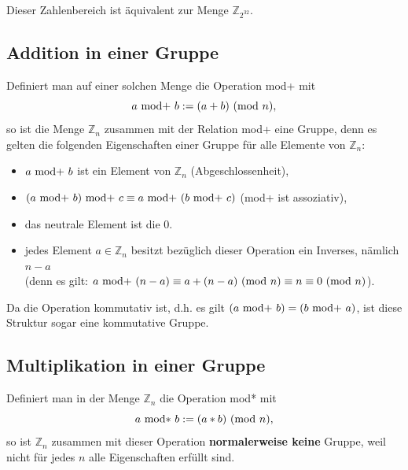 \begin{refsegment}
Dieser Zahlenbereich ist äquivalent zur Menge $\mathbb{Z}_{2^{32}}$.


\subsection{Addition in einer Gruppe}

Definiert man auf einer solchen Menge die Operation mod+ mit
$$ a {\rm ~mod+~} b := (a + b){\rm ~(mod~}n) , $$
so ist die Menge $\mathbb{Z}_n$ zusammen mit der Relation mod+ eine Gruppe, denn es
gelten die folgenden Eigenschaften einer Gruppe für alle Elemente von $\mathbb{Z}_n$:
\begin{itemize}
    \item   $ a {\rm ~mod+~} b$ ist ein Element von $\mathbb{Z}_n$  (Abgeschlossenheit),
    \item   $(a {\rm ~mod+~} b) {\rm ~mod+~} c \equiv a {\rm ~mod+~} (b {\rm ~mod+~} c)$  (mod+ ist assoziativ),
    \item   das neutrale Element ist die $0$.
  \item   jedes Element $a \in \mathbb{Z}_n$ besitzt bezüglich dieser Operation ein Inverses, nämlich $n-a$\\
                (denn es gilt: $a {\rm ~mod+~} (n-a) \equiv a + (n-a){\rm ~(mod~}n) \equiv n \equiv 0 {\rm ~(mod~}n)$).
\end{itemize}
Da die Operation kommutativ ist, d.h. es gilt $(a {\rm ~mod+~} b) = (b {\rm ~mod+~} a)$, ist diese Struktur  sogar
eine \glqq kommutative Gruppe\grqq.


\subsection{Multiplikation in einer Gruppe}

Definiert man in der Menge $\mathbb{Z}_n$ die Operation mod* mit
$$ a {\rm ~mod*~} b := (a * b){\rm ~(mod~}n), $$
so ist $\mathbb{Z}_n$ zusammen mit dieser Operation \textbf{normalerweise keine} Gruppe, weil
nicht für jedes $n$ alle Eigenschaften erfüllt sind.


\end{refsegment}
